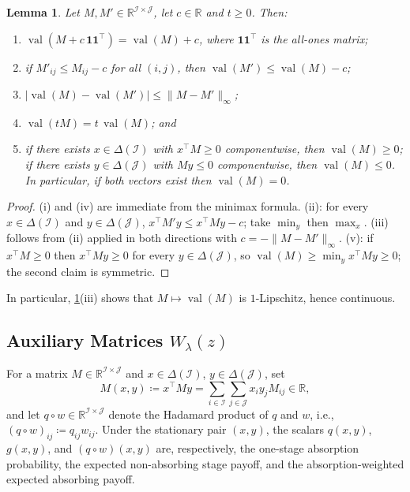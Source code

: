 \documentclass[11pt, a4paper]{article}
\theoremstyle{plain}
\newtheorem{lemma}{Lemma}
\theoremstyle{definition}
\newcommand{\R}{\mathbb{R}}
\DeclareMathOperator{\val}{val}
\newcommand{\defas}{\coloneqq}
\newcommand{\I}{\mathcal{I}}
\newcommand{\J}{\mathcal{J}}
\begin{document}
\begin{lemma}\label{lem:matrixgames}
Let $M,M'\in\R^{\I\times\J}$, let $c\in\R$ and $t\geq0$. Then:
\begin{enumerate}
\item[\emph{(i)}] $\val(M+c\,\mathbf{1}\mathbf{1}^{\top})=\val(M)+c$, where $\mathbf{1}\mathbf{1}^{\top}$ is the all-ones matrix;
\item[\emph{(ii)}] if $M'_{ij}\leq M_{ij}-c$ for all $(i,j)$, then $\val(M')\leq\val(M)-c$;
\item[\emph{(iii)}] $|\val(M)-\val(M')|\leq\|M-M'\|_\infty$;
\item[\emph{(iv)}] $\val(tM)=t\,\val(M)$; and 
\item[\emph{(v)}] if there exists $x\in\Delta(\I)$ with $x^{\top}M\geq0$ componentwise, then $\val(M)\geq0$; if there exists $y\in\Delta(\J)$ with $My\leq0$ componentwise, then $\val(M)\leq0$. In particular, if both vectors exist then $\val(M)=0$.
\end{enumerate}
\end{lemma}

\begin{proof}
(i) and (iv) are immediate from the minimax formula. (ii): for every $x\in\Delta(\I)$ and $y\in\Delta(\J)$, $x^{\top}M'y\leq x^{\top}My-c$; take $\min_y$ then $\max_x$. (iii) follows from (ii) applied in both directions with $c=-\|M-M'\|_\infty$. (v): if $x^{\top}M\geq0$ then $x^{\top}My\geq0$ for every $y\in\Delta(\J)$, so $\val(M)\geq\min_yx^{\top}My\geq0$; the second claim is symmetric.
\end{proof}
In particular, \cref{lem:matrixgames}(iii) shows that $M\mapsto\val(M)$ is $1$-Lipschitz, hence continuous.

\subsection{\texorpdfstring{Auxiliary Matrices $W_\lambda(z)$}{Auxiliary Matrices W-lambda(z)}}

For a matrix $M\in\R^{\I\times\J}$ and $x\in\Delta(\I)$, $y\in\Delta(\J)$, set
\[
M(x,y)\defas x^{\top}My=\sum_{i\in\I}\sum_{j\in\J}x_iy_jM_{ij}\in\R ,
\]
and let $q\circ w\in\R^{\I\times\J}$ denote the Hadamard product of $q$ and $w$, i.e., $(q\circ w)_{ij}\defas q_{ij}w_{ij}$. Under the stationary pair $(x,y)$, the scalars $q(x,y)$, $g(x,y)$, and $(q\circ w)(x,y)$ are, respectively, the one-stage absorption probability, the expected non-absorbing stage payoff, and the absorption-weighted expected absorbing payoff.
\end{document}
